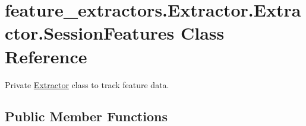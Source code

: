 \hypertarget{classfeature__extractors_1_1_extractor_1_1_extractor_1_1_session_features}{}\section{feature\+\_\+extractors.\+Extractor.\+Extractor.\+Session\+Features Class Reference}
\label{classfeature__extractors_1_1_extractor_1_1_extractor_1_1_session_features}


Private \mbox{\hyperlink{classfeature__extractors_1_1_extractor_1_1_extractor}{Extractor}} class to track feature data.  


\subsection*{Public Member Functions}
